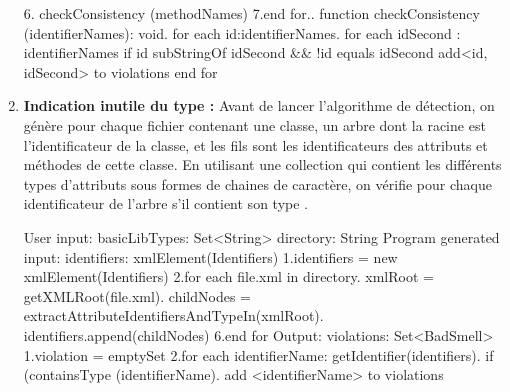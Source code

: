 \begin{enumerate}
\begin{framed}
{6.   checkConsistency (methodNames)\newline
7.end for.. function checkConsistency (identifierNames): void.	for each id:identifierNames.	    for each idSecond : identifierNames\newline
if id subStringOf idSecond && !id equals idSecond\newline
add<id, idSecond> to violations\newline
end for\newline
}
\end{framed}
\newline
\item \textbf {	Indication inutile du type :}
Avant de lancer l'algorithme de détection, on génère pour chaque fichier contenant une classe, un arbre dont la racine est l'identificateur de la classe, et les fils sont les identificateurs des attributs et méthodes de cette classe.
En utilisant une collection qui contient les différents types d'attributs sous formes de chaines de caractère, on vérifie pour chaque identificateur de l'arbre s'il contient son type \cite{abebe2009lexicon}.
\begin{framed}
  {\selectfont  
User input:\newline
 basicLibTypes: Set<String>\newline
 directory: String\newline
 Program generated input:\newline
 identifiers: xmlElement(Identifiers)\newline
 1.identifiers = new xmlElement(Identifiers)\newline
 2.for each file.xml in directory.	xmlRoot = getXMLRoot(file.xml).	childNodes = extractAttributeIdentifiersAndTypeIn(xmlRoot).	identifiers.append(childNodes)\newline
 6.end for\newline
 Output:\newline
 violations: Set<BadSmell>\newline
 1.violation = emptySet\newline
 2.for each identifierName: getIdentifier(identifiers).   if (containsType (identifierName).         add <identifierName> to violations\newline
 }
\end{framed}


\end{enumerate}
